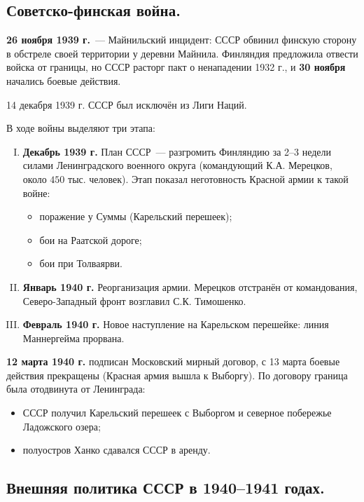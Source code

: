 \documentclass[12pt]{article}
\begin{document}
	\subsection{Советско-финская война.}
	\textbf{26 ноября 1939 г.}~--- Майнильский инцидент: СССР обвинил финскую сторону в обстреле своей территории у деревни Майнила. Финляндия предложила отвести войска от границы, но СССР расторг пакт о ненападении 1932 г., и \textbf{30 ноября} начались боевые действия.
	\begin{note}
		14 декабря 1939 г. СССР был исключён из Лиги Наций.
	\end{note}
	В ходе войны выделяют три этапа:
	\begin{enumerate}[I.]
		\item \textbf{Декабрь 1939 г.} План СССР~--- разгромить Финляндию за 2--3 недели силами Ленинградского военного округа (командующий К.А. Мерецков, около $450$ тыс. человек). Этап показал неготовность Красной армии к такой войне:
		\begin{itemize}
			\item поражение у Суммы (Карельский перешеек);
			\item бои на Раатской дороге;
			\item бои при Толваярви.
		\end{itemize}
		\item \textbf{Январь 1940 г.} Реорганизация армии. Мерецков отстранён от командования, Северо-Западный фронт возглавил С.К. Тимошенко.
		\item \textbf{Февраль 1940 г.} Новое наступление на Карельском перешейке: линия Маннергейма прорвана.
	\end{enumerate}
	\textbf{12 марта 1940 г.} подписан Московский мирный договор, с 13 марта боевые действия прекращены (Красная армия вышла к Выборгу). По договору граница была отодвинута от Ленинграда:
	\begin{itemize}
		\item СССР получил Карельский перешеек с Выборгом и северное побережье Ладожского озера;
		\item полуостров Ханко сдавался СССР в аренду.
	\end{itemize}

	\subsection{Внешняя политика СССР в 1940--1941 годах.}
	
\end{document}
